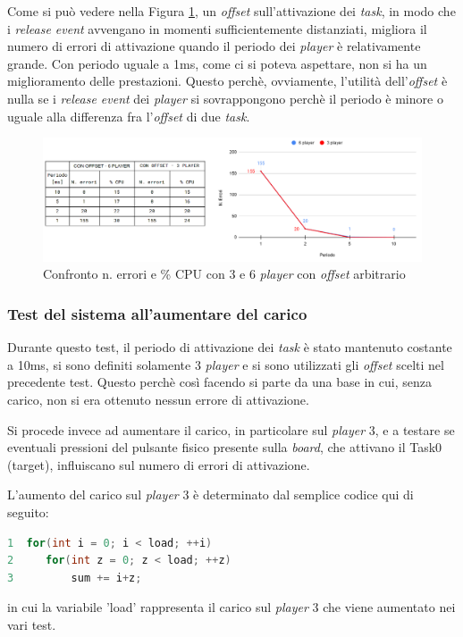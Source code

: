 \documentclass{article}
\begin{document}
Come si può vedere nella Figura \ref{noC-siO}, un \textit{offset} sull'attivazione dei \textit{task}, in modo che i \textit{release event} avvengano in momenti sufficientemente distanziati, migliora il numero di errori di attivazione quando il periodo dei \textit{player} è relativamente grande. Con periodo uguale a 1ms, come ci si poteva aspettare, non si ha un miglioramento delle prestazioni. Questo perchè, ovviamente, l'utilità dell'\textit{offset} è nulla se i \textit{release event} dei \textit{player} si sovrappongono perchè il periodo è minore o uguale alla differenza fra l'\textit{offset} di due \textit{task}.
\begin{figure}[H]
	\centering
	\includegraphics[width=6in]{image/NO_CARICO-OFFSET.png}
	\caption{Confronto n. errori e \% CPU con 3 e 6 \textit{player} con \textit{offset} arbitrario}
	\label{noC-siO}
\end{figure}

\subsubsection{Test del sistema all'aumentare del carico}
Durante questo test, il periodo di attivazione dei \textit{task} è stato mantenuto costante a 10ms, si sono definiti solamente 3 \textit{player} e si sono utilizzati gli \textit{offset} scelti nel precedente test. Questo perchè così facendo si parte da una base in cui, senza carico, non si era ottenuto nessun errore di attivazione.

Si procede invece ad aumentare il carico, in particolare sul \textit{player} 3, e a testare se eventuali pressioni del pulsante fisico presente sulla \textit{board}, che attivano il Task0 (target), influiscano sul numero di errori di attivazione.

L'aumento del carico sul \textit{player} 3 è determinato dal semplice codice qui di seguito:
\begin{lstlisting}[language=C]
1  for(int i = 0; i < load; ++i)
2	  for(int z = 0; z < load; ++z)
3		  sum += i+z;
\end{lstlisting}
in cui la variabile 'load' rappresenta il carico sul \textit{player} 3 che viene aumentato nei vari test.
\end{document}
